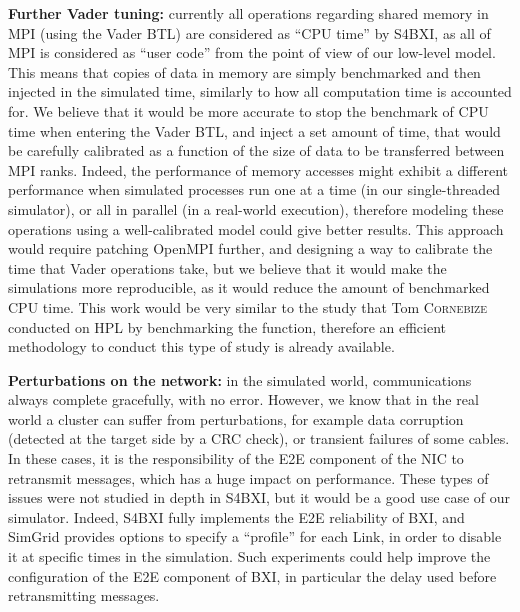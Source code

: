 \bigskip

\textbf{Further Vader tuning:} currently all operations regarding shared memory
in MPI (using the Vader BTL) are considered as ``CPU time'' by S4BXI, as all of
MPI is considered as ``user code'' from the point of view of our low-level
model. This means that copies of data in memory are simply benchmarked and then
injected in the simulated time, similarly to how all computation time is
accounted for. We believe that it would be more accurate to stop the benchmark
of CPU time when entering the Vader BTL, and inject a set amount of time, that
would be carefully calibrated as a function of the size of data to be
transferred between MPI ranks. Indeed, the performance of memory accesses might
exhibit a different performance when simulated processes run one at a time (in
our single-threaded simulator), or all in parallel (in a real-world execution),
therefore modeling these operations using a well-calibrated model could give
better results. This approach would require patching OpenMPI further, and
designing a way to calibrate the time that Vader operations take, but we believe
that it would make the simulations more reproducible, as it would reduce the
amount of benchmarked CPU time. This work would be very similar to the study
that Tom \textsc{Cornebize} conducted on HPL by benchmarking the
 function, therefore an efficient methodology to conduct this
type of study is already available.

\bigskip

\textbf{Perturbations on the network:} in the simulated world, communications
always complete gracefully, with no error. However, we know that in the real
world a cluster can suffer from perturbations, for example data corruption
(detected at the target side by a CRC check), or transient failures of some
cables. In these cases, it is the responsibility of the E2E component of the NIC
to retransmit messages, which has a huge impact on performance. These types of
issues were not studied in depth in S4BXI, but it would be a good use case of
our simulator. Indeed, S4BXI fully implements the E2E reliability of BXI, and
SimGrid provides options to specify a ``profile'' for each Link, in order to
disable it at specific times in the simulation. Such experiments could help
improve the configuration of the E2E component of BXI, in particular the delay
used before retransmitting messages.

\bigskip

